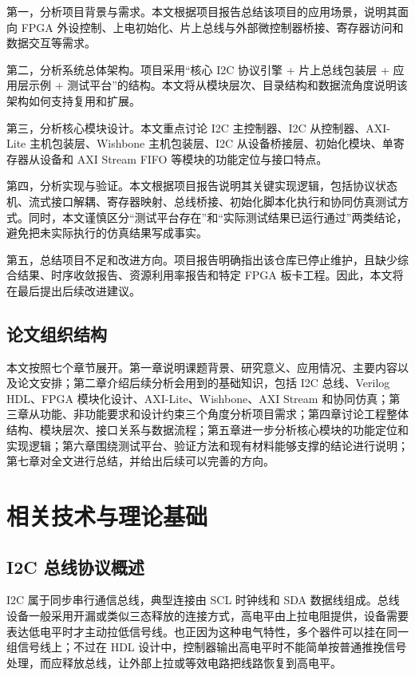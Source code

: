 \documentclass[12pt,a4paper]{article}
\numberwithin{equation}{section}
\begin{document}
第一，分析项目背景与需求。本文根据项目报告总结该项目的应用场景，说明其面向 FPGA 外设控制、上电初始化、片上总线与外部微控制器桥接、寄存器访问和数据交互等需求。

第二，分析系统总体架构。项目采用“核心 I2C 协议引擎 + 片上总线包装层 + 应用层示例 + 测试平台”的结构。本文将从模块层次、目录结构和数据流角度说明该架构如何支持复用和扩展。

第三，分析核心模块设计。本文重点讨论 I2C 主控制器、I2C 从控制器、AXI-Lite 主机包装层、Wishbone 主机包装层、I2C 从设备桥接层、初始化模块、单寄存器从设备和 AXI Stream FIFO 等模块的功能定位与接口特点。

第四，分析实现与验证。本文根据项目报告说明其关键实现逻辑，包括协议状态机、流式接口解耦、寄存器映射、总线桥接、初始化脚本化执行和协同仿真测试方式。同时，本文谨慎区分“测试平台存在”和“实际测试结果已运行通过”两类结论，避免把未实际执行的仿真结果写成事实。

第五，总结项目不足和改进方向。项目报告明确指出该仓库已停止维护，且缺少综合结果、时序收敛报告、资源利用率报告和特定 FPGA 板卡工程。因此，本文将在最后提出后续改进建议。

\subsection{论文组织结构}

本文按照七个章节展开。第一章说明课题背景、研究意义、应用情况、主要内容以及论文安排；第二章介绍后续分析会用到的基础知识，包括 I2C 总线、Verilog HDL、FPGA 模块化设计、AXI-Lite、Wishbone、AXI Stream 和协同仿真；第三章从功能、非功能要求和设计约束三个角度分析项目需求；第四章讨论工程整体结构、模块层次、接口关系与数据流程；第五章进一步分析核心模块的功能定位和实现逻辑；第六章围绕测试平台、验证方法和现有材料能够支撑的结论进行说明；第七章对全文进行总结，并给出后续可以完善的方向。

\clearpage
\section{相关技术与理论基础}

\subsection{I2C 总线协议概述}

I2C 属于同步串行通信总线，典型连接由 SCL 时钟线和 SDA 数据线组成。总线设备一般采用开漏或类似三态释放的连接方式，高电平由上拉电阻提供，设备需要表达低电平时才主动拉低信号线。也正因为这种电气特性，多个器件可以挂在同一组信号线上；不过在 HDL 设计中，控制器输出高电平时不能简单按普通推挽信号处理，而应释放总线，让外部上拉或等效电路把线路恢复到高电平。
\end{document}
